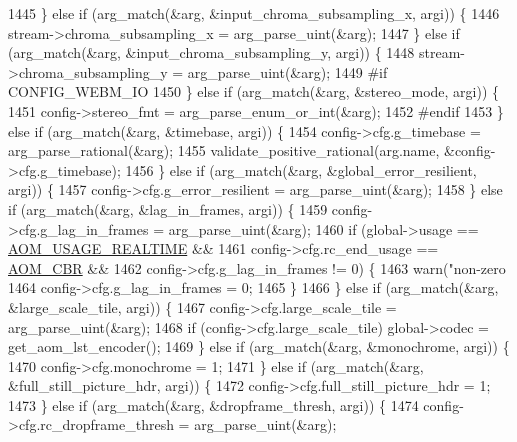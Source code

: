 \begin{DoxyCodeInclude}
{{{{{{{{{{{{{{{{1445     \} \textcolor{keywordflow}{else} \textcolor{keywordflow}{if} (arg\_match(&arg, &input\_chroma\_subsampling\_x, argi)) \{
1446       stream->chroma\_subsampling\_x = arg\_parse\_uint(&arg);
1447     \} \textcolor{keywordflow}{else} \textcolor{keywordflow}{if} (arg\_match(&arg, &input\_chroma\_subsampling\_y, argi)) \{
1448       stream->chroma\_subsampling\_y = arg\_parse\_uint(&arg);
1449 \textcolor{preprocessor}{#if CONFIG\_WEBM\_IO}
1450     \} \textcolor{keywordflow}{else} \textcolor{keywordflow}{if} (arg\_match(&arg, &stereo\_mode, argi)) \{
1451       config->stereo\_fmt = arg\_parse\_enum\_or\_int(&arg);
1452 \textcolor{preprocessor}{#endif}
1453     \} \textcolor{keywordflow}{else} \textcolor{keywordflow}{if} (arg\_match(&arg, &timebase, argi)) \{
1454       config->cfg.g\_timebase = arg\_parse\_rational(&arg);
1455       validate\_positive\_rational(arg.name, &config->cfg.g\_timebase);
1456     \} \textcolor{keywordflow}{else} \textcolor{keywordflow}{if} (arg\_match(&arg, &global\_error\_resilient, argi)) \{
1457       config->cfg.g\_error\_resilient = arg\_parse\_uint(&arg);
1458     \} \textcolor{keywordflow}{else} \textcolor{keywordflow}{if} (arg\_match(&arg, &lag\_in\_frames, argi)) \{
1459       config->cfg.g\_lag\_in\_frames = arg\_parse\_uint(&arg);
1460       \textcolor{keywordflow}{if} (global->usage == \hyperlink{group__encoder_gae2cc24d3083099df8eb60ad65f81c62f}{AOM\_USAGE\_REALTIME} &&
1461           config->cfg.rc\_end\_usage == \hyperlink{group__encoder_gga7c084d3ecef569aad166ce70b0e8a957a14b6057d61c61e6117f5af16dcf89b0c}{AOM\_CBR} &&
1462           config->cfg.g\_lag\_in\_frames != 0) \{
1463         warn(\textcolor{stringliteral}{"non-zero %
1464         config->cfg.g\_lag\_in\_frames = 0;
1465       \}
1466     \} \textcolor{keywordflow}{else} \textcolor{keywordflow}{if} (arg\_match(&arg, &large\_scale\_tile, argi)) \{
1467       config->cfg.large\_scale\_tile = arg\_parse\_uint(&arg);
1468       \textcolor{keywordflow}{if} (config->cfg.large\_scale\_tile) global->codec = get\_aom\_lst\_encoder();
1469     \} \textcolor{keywordflow}{else} \textcolor{keywordflow}{if} (arg\_match(&arg, &monochrome, argi)) \{
1470       config->cfg.monochrome = 1;
1471     \} \textcolor{keywordflow}{else} \textcolor{keywordflow}{if} (arg\_match(&arg, &full\_still\_picture\_hdr, argi)) \{
1472       config->cfg.full\_still\_picture\_hdr = 1;
1473     \} \textcolor{keywordflow}{else} \textcolor{keywordflow}{if} (arg\_match(&arg, &dropframe\_thresh, argi)) \{
1474       config->cfg.rc\_dropframe\_thresh = arg\_parse\_uint(&arg);
}}}}}}}}}}}}}}}}}
\end{DoxyCodeInclude}
